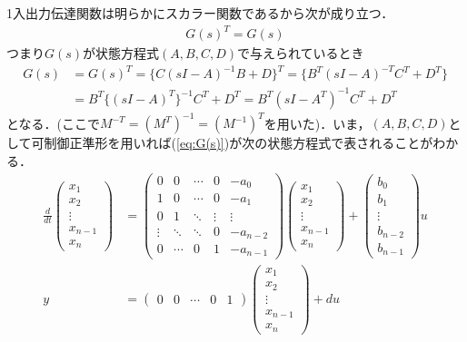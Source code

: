 1入出力伝達関数は明らかにスカラー関数であるから次が成り立つ．
\begin{align}
 G(s)^T = G(s)
\end{align}
つまり$G(s)$が状態方程式$(A,B,C,D)$で与えられているとき
\begin{align}
 G(s) &= G(s)^T = \{ C(sI-A)^{-1}B + D\} ^T = \{ B^T (sI-A)^{-T} C^T + D^T\} 
\nonumber\\
 &= B^T \{(sI-A)^{T}\}^{-1} C^T + D^T = B^T (sI - A^{T})^{-1} C^T + D^T
\end{align}
となる．(ここで$M^{-T} = (M^{T})^{-1} = (M^{-1})^T$を用いた)．いま，$(A,B,C,D)$として可制御正準形を用いれば(\ref{eq:G(s)})が次の状態方程式で表されることがわかる．
\begin{align}
 \frac{d}{dt}
  \left(\begin{array}{c}
         x_1 \\
	 x_2 \\
	 \vdots \\
	 x_{n-1} \\
	 x_n
	\end{array}\right)
  &=
  \left(\begin{array}{ccccc}
     0      & 0      & \cdots & 0      & -a_0  \\
	 1      & 0      & \cdots & 0      & -a_1 \\
     0      & 1      & \ddots & \vdots & \vdots \\
	 \vdots & \ddots & \ddots & 0      & -a_{n-2} \\
	 0      & \cdots & 0      & 1      & -a_{n-1}
	\end{array}\right)
  \left(\begin{array}{c}
	 x_1 \\
	 x_2 \\
	 \vdots \\
	 x_{n-1} \\
	 x_n
	\end{array}\right)
  +
  \left(\begin{array}{c}
     b_0 \\
	 b_1 \\
	 \vdots \\
	 b_{n-2} \\
	 b_{n-1}
	\end{array}\right)
  u \label{eq:canoform_o}\\
y &=
 \left(\begin{array}{ccccc}
        0 & 0 & \cdots & 0 & 1
       \end{array}\right)
 \left(\begin{array}{c}
        x_1 \\
	x_2 \\
	\vdots \\
	x_{n-1} \\
	x_n
       \end{array}\right)
 + d u
\end{align}
